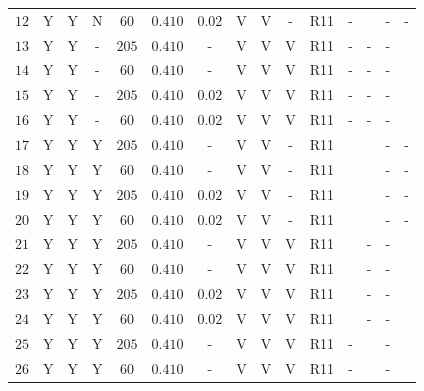 \begin{table}[tbp]
{\begin{tabular}{lcccccccccccccr}
\rule[-1ex]{0pt}{2.5ex} $12$ & Y & Y & N & $60$ & $0.410$ & $0.02$ & V & V & - & R11 & - & \cite{Pietrzynski:2013gia} & - & - \\
\rule[-1ex]{0pt}{2.5ex} $13$ & Y & Y & - & $205$ & $0.410$ & - & V & V & V & R11 & - & - & - & \cite{vanLeeuwen:2007xw} \\ 
\rule[-1ex]{0pt}{2.5ex} $14$ & Y & Y & - & $60$ & $0.410$ & - & V & V & V & R11 & - & - & - & \cite{vanLeeuwen:2007xw} \\
\rule[-1ex]{0pt}{2.5ex} $15$ & Y & Y & - & $205$ & $0.410$ & $0.02$ & V & V & V & R11 & - & - & - & \cite{vanLeeuwen:2007xw} \\
\rule[-1ex]{0pt}{2.5ex} $16$ & Y & Y & - & $60$ & $0.410$ & $0.02$ & V & V & V & R11 & - & - & - & \cite{vanLeeuwen:2007xw} \\
\rule[-1ex]{0pt}{2.5ex} $17$ & Y & Y & Y & $205$ & $0.410$ & - & V & V & - & R11 & \cite{Humphreys:2013eja} & \cite{Pietrzynski:2013gia} & - & - \\
\rule[-1ex]{0pt}{2.5ex} $18$ & Y & Y & Y & $60$ & $0.410$ & - & V & V & - & R11 & \cite{Humphreys:2013eja} & \cite{Pietrzynski:2013gia} & - & - \\
\rule[-1ex]{0pt}{2.5ex} $19$ & Y & Y & Y & $205$ & $0.410$ & $0.02$ & V & V & - & R11 & \cite{Humphreys:2013eja} & \cite{Pietrzynski:2013gia} & - & - \\
\rule[-1ex]{0pt}{2.5ex} $20$ & Y & Y & Y & $60$ & $0.410$ & $0.02$ & V & V & - & R11 & \cite{Humphreys:2013eja} & \cite{Pietrzynski:2013gia} & - & - \\ 
\rule[-1ex]{0pt}{2.5ex} $21$ & Y & Y & Y & $205$ & $0.410$ & - & V & V & V & R11 & \cite{Humphreys:2013eja} & - & - & \cite{vanLeeuwen:2007xw} \\ 
\rule[-1ex]{0pt}{2.5ex} $22$ & Y & Y & Y & $60$ & $0.410$ & - & V & V & V & R11 & \cite{Humphreys:2013eja} & - & - & \cite{vanLeeuwen:2007xw} \\
\rule[-1ex]{0pt}{2.5ex} $23$ & Y & Y & Y & $205$ & $0.410$ & $0.02$ & V & V & V & R11 & \cite{Humphreys:2013eja} & - & - & \cite{vanLeeuwen:2007xw} \\
\rule[-1ex]{0pt}{2.5ex} $24$ & Y & Y & Y & $60$ & $0.410$ & $0.02$ & V & V & V & R11 & \cite{Humphreys:2013eja} & - & - & \cite{vanLeeuwen:2007xw} \\
\rule[-1ex]{0pt}{2.5ex} $25$ & Y & Y & Y & $205$ & $0.410$ & - & V & V & V & R11 & - & \cite{Pietrzynski:2013gia} & - & \cite{vanLeeuwen:2007xw} \\ 
\rule[-1ex]{0pt}{2.5ex} $26$ & Y & Y & Y & $60$ & $0.410$ & - & V & V & V & R11 & - & \cite{Pietrzynski:2013gia} & - & \cite{vanLeeuwen:2007xw} \\

\end{tabular}}
\end{table}
